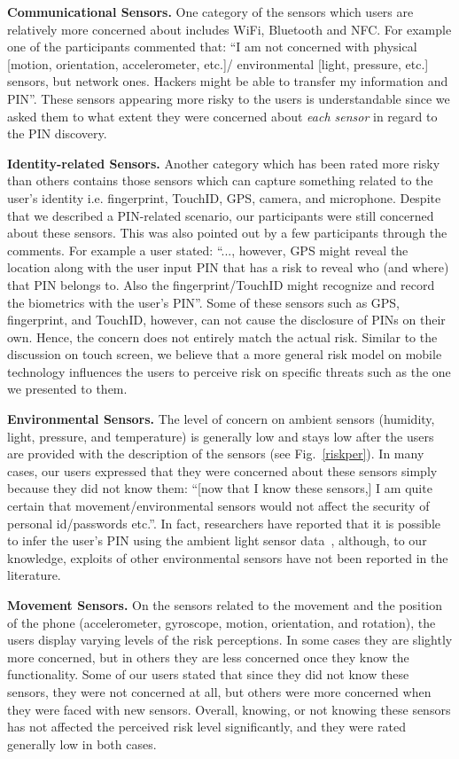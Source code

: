 \documentclass[10pt,twocolumn]{article}
\begin{document}
\textbf{Communicational Sensors.} 
One category of the sensors which users are relatively more concerned about includes WiFi, Bluetooth and NFC. For example one of the participants commented that: ``I am not concerned with physical [motion, orientation, accelerometer, etc.]/ environmental [light, pressure, etc.] sensors, but network ones. Hackers might be able to transfer my information and PIN''. These sensors appearing more risky to the users is understandable since we asked them to what extent they were concerned about \emph{each sensor} in regard to the PIN discovery. 

\textbf{Identity-related Sensors.} Another category which has been rated more risky than others contains those sensors which can capture something related to the user's identity i.e. fingerprint, TouchID, GPS, camera, and microphone. Despite that we described a PIN-related scenario, our participants were still concerned about these sensors.   
This was also pointed out by a few participants through the comments. 
For example a user stated: ``..., however, GPS might reveal the location along with the user input PIN that has a risk to reveal who (and where) that PIN belongs to. Also the fingerprint/TouchID might recognize and record the biometrics with the user's PIN''. Some of these sensors such as GPS, fingerprint, and TouchID, however, can not cause the disclosure of PINs on their own. Hence, the concern does not entirely match the actual risk. Similar to the discussion on touch screen, we believe that a more general risk model on mobile technology influences the users to perceive risk on specific threats such as the one we presented to them. 

\textbf{Environmental Sensors.} The level of concern on ambient sensors (humidity, light, pressure, and temperature) is generally low and stays low after the users are provided with the description of the sensors (see Fig.~\ref{riskper}). 
In many cases, our users expressed that they were concerned about these sensors simply because they did not know them: ``[now that I know these sensors,] I am quite certain that movement/environmental sensors would not affect the security of personal id/passwords etc.''.
In fact, researchers have reported that it is possible to infer the user's PIN using the ambient light sensor data~\cite{SkimLight}, although, to our knowledge, exploits of other environmental sensors have not been reported in the literature. 

\textbf{Movement Sensors.} On the sensors related to the movement and the position of the phone (accelerometer, gyroscope, motion, orientation, and rotation), the users display varying levels of the risk perceptions. In some cases they are slightly more concerned, but in others they are less concerned once they know the functionality. Some of our users stated that since they did not know these sensors, they were not concerned at all, but others were more concerned when they were faced with new sensors. Overall, knowing, or not knowing these sensors has not affected the perceived risk level significantly, and they were rated generally low in both cases. 
\end{document}
